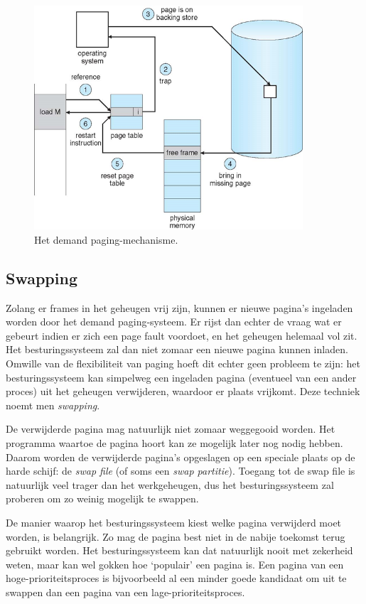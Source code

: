 \begin{figure}
\begin{center}
\includegraphics[width=100mm]{images/demand_paging.png}
\end{center}
\caption{Het demand paging-mechanisme.}
\label{demand_paging}
\end{figure}

\subsection{Swapping}

Zolang er frames in het geheugen vrij zijn, kunnen er nieuwe pagina's ingeladen worden door het demand paging-systeem. Er rijst dan echter de vraag wat er gebeurt indien er zich een page fault voordoet, en het geheugen helemaal vol zit. Het besturingssysteem zal dan niet zomaar een nieuwe pagina kunnen inladen. Omwille van de flexibiliteit van paging hoeft dit echter geen probleem te zijn: het besturingssysteem kan simpelweg een ingeladen pagina (eventueel van een ander proces) uit het geheugen verwijderen, waardoor er plaats vrijkomt. Deze techniek noemt men \emph{swapping}.

De verwijderde pagina mag natuurlijk niet zomaar weggegooid worden. Het programma waartoe de pagina hoort kan ze mogelijk later nog nodig hebben. Daarom worden de verwijderde pagina's opgeslagen op een speciale plaats op de harde schijf: de \emph{swap file} (of soms een \emph{swap partitie}). Toegang tot de swap file is natuurlijk veel trager dan het werkgeheugen, dus het besturingssysteem zal proberen om zo weinig mogelijk te swappen.

De manier waarop het besturingssysteem kiest welke pagina verwijderd moet worden, is belangrijk. Zo mag de pagina best niet in de nabije toekomst terug gebruikt worden. Het besturingssysteem kan dat natuurlijk nooit met zekerheid weten, maar kan wel gokken hoe `populair' een pagina is. Een pagina van een hoge-prioriteitsproces is bijvoorbeeld al een minder goede kandidaat om uit te swappen dan een pagina van een lage-prioriteitsproces.


